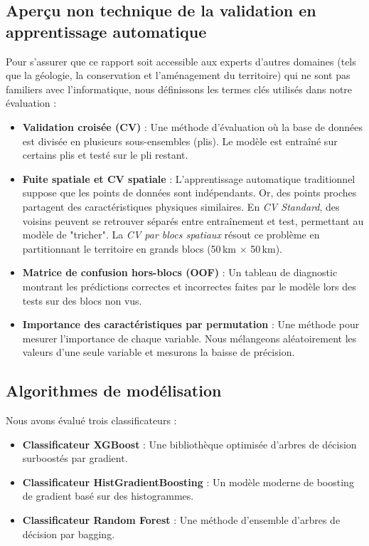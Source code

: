 \documentclass[11pt,twocolumn,a4paper]{article}
\begin{document}
\subsection{Aperçu non technique de la validation en apprentissage automatique}
Pour s'assurer que ce rapport soit accessible aux experts d'autres domaines (tels que la géologie, la conservation et l'aménagement du territoire) qui ne sont pas familiers avec l'informatique, nous définissons les termes clés utilisés dans notre évaluation :
\begin{itemize}
    \item \textbf{Validation croisée (CV)} : Une méthode d'évaluation où la base de données est divisée en plusieurs sous-ensembles (plis). Le modèle est entraîné sur certains plis et testé sur le pli restant.
    \item \textbf{Fuite spatiale et CV spatiale} : L'apprentissage automatique traditionnel suppose que les points de données sont indépendants. Or, des points proches partagent des caractéristiques physiques similaires. En \emph{CV Standard}, des voisins peuvent se retrouver séparés entre entraînement et test, permettant au modèle de "tricher". La \emph{CV par blocs spatiaux} résout ce problème en partitionnant le territoire en grands blocs (50\,km $\times$ 50\,km).
    \item \textbf{Matrice de confusion hors-blocs (OOF)} : Un tableau de diagnostic montrant les prédictions correctes et incorrectes faites par le modèle lors des tests sur des blocs non vus.
    \item \textbf{Importance des caractéristiques par permutation} : Une méthode pour mesurer l'importance de chaque variable. Nous mélangeons aléatoirement les valeurs d'une seule variable et mesurons la baisse de précision.
\end{itemize}

\subsection{Algorithmes de modélisation}
Nous avons évalué trois classificateurs :
\begin{itemize}
    \item \textbf{Classificateur XGBoost} : Une bibliothèque optimisée d'arbres de décision surboostés par gradient.
    \item \textbf{Classificateur HistGradientBoosting} : Un modèle moderne de boosting de gradient basé sur des histogrammes.
    \item \textbf{Classificateur Random Forest} : Une méthode d'ensemble d'arbres de décision par bagging.
\end{itemize}
\end{document}
